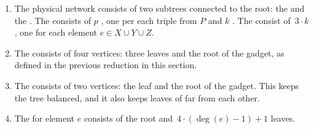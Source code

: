 \begin{enumerate}
  \item The physical network consists of two subtrees connected to the
  root: the \emph{\MatchSubtree} and the \emph{\CoverSubtree}. The
  {\MatchSubtree} consists of $p$ \emph{\TripleGadgets}, one per each triple from $P$ and $k$
  \emph{\UnqGadgets}. The {\CoverSubtree} consist of~$3\cdot k$ {\ElGadgets}, one for each element $e\in X\cup Y\cup Z$.
  \item The {\TripleGadget} consists of four vertices: three leaves and the root of the gadget, as defined in the previous reduction in this section.
  \item The {\UnqGadget} consists of two vertices: the leaf and the root of the gadget.
  This keeps the tree balanced, and it also keeps leaves of
  {\UnqGadgets} far from each other.
  \item The {\ElGadget} for element $e$ consists of the
  root and~$4\cdot(\deg(e)-1)+1$ leaves.
\end{enumerate}

